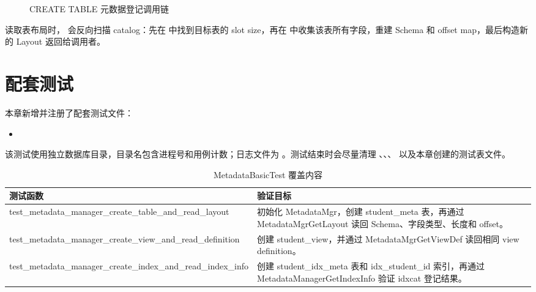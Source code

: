 \begin{figure}[htbp]
  \centering
  \caption{CREATE TABLE 元数据登记调用链}
  \label{fig:metadata-create-table-flow}
\end{figure}

读取表布局时， 会反向扫描 catalog：先在  中找到目标表的 slot size，再在  中收集该表所有字段，重建 Schema 和 offset map，最后构造新的 Layout 返回给调用者。

\section{配套测试}
\label{sec:metadata-test}

本章新增并注册了配套测试文件：

\begin{itemize}
  \item {}
\end{itemize}

该测试使用独立数据库目录，目录名包含进程号和用例计数；日志文件为 。测试结束时会尽量清理 、、、 以及本章创建的测试表文件。

\begin{table}[htbp]
  \centering
  \caption{MetadataBasicTest 覆盖内容}
  \label{tab:metadata-tests}
  \begin{tabularx}{\textwidth}{>{\ttfamily}l Y}
    \toprule
    测试函数 & 验证目标 \\
    \midrule
    test\_metadata\_manager\_create\_table\_and\_read\_layout & 初始化 MetadataMgr，创建 student\_meta 表，再通过 MetadataMgrGetLayout 读回 Schema、字段类型、长度和 offset。\\
    test\_metadata\_manager\_create\_view\_and\_read\_definition & 创建 student\_view，并通过 MetadataMgrGetViewDef 读回相同 view definition。\\
    test\_metadata\_manager\_create\_index\_and\_read\_index\_info & 创建 student\_idx\_meta 表和 idx\_student\_id 索引，再通过 MetadataManagerGetIndexInfo 验证 idxcat 登记结果。\\
    \bottomrule
  \end{tabularx}
\end{table}


